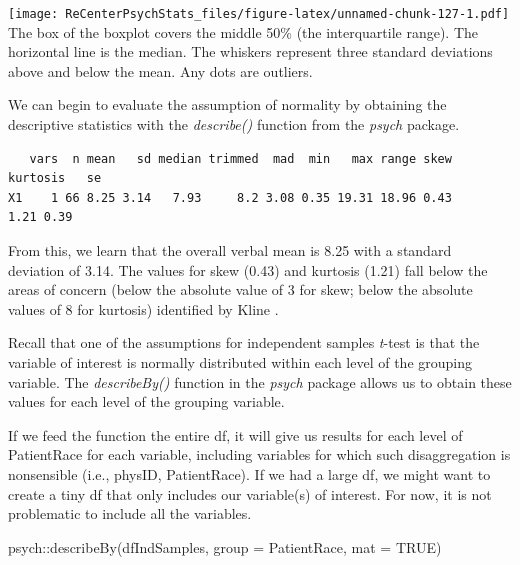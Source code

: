 \documentclass[
  11pt,
]{book}
\newenvironment{Shaded}{\begin{snugshade}}{\end{snugshade}}
\newcommand{\AttributeTok}[1]{\textcolor[rgb]{0.77,0.63,0.00}{#1}}
\newcommand{\ConstantTok}[1]{\textcolor[rgb]{0.00,0.00,0.00}{#1}}
\newcommand{\FunctionTok}[1]{\textcolor[rgb]{0.00,0.00,0.00}{#1}}
\newcommand{\NormalTok}[1]{#1}
\newcommand{\SpecialCharTok}[1]{\textcolor[rgb]{0.00,0.00,0.00}{#1}}
\begin{document}
\texttt{[image: ReCenterPsychStats\_files/figure-latex/unnamed-chunk-127-1.pdf]}
The box of the boxplot covers the middle 50\% (the interquartile range). The horizontal line is the median. The whiskers represent three standard deviations above and below the mean. Any dots are outliers.

We can begin to evaluate the assumption of normality by obtaining the descriptive statistics with the \emph{describe()} function from the \emph{psych} package.

\begin{Shaded}
\end{Shaded}

\begin{verbatim}
   vars  n mean   sd median trimmed  mad  min   max range skew kurtosis   se
X1    1 66 8.25 3.14   7.93     8.2 3.08 0.35 19.31 18.96 0.43     1.21 0.39
\end{verbatim}

From this, we learn that the overall verbal mean is 8.25 with a standard deviation of 3.14. The values for skew (0.43) and kurtosis (1.21) fall below the areas of concern (below the absolute value of 3 for skew; below the absolute values of 8 for kurtosis) identified by Kline \citeyearpar{kline_principles_2016}.

Recall that one of the assumptions for independent samples \emph{t}-test is that the variable of interest is normally distributed within each level of the grouping variable. The \emph{describeBy()} function in the \emph{psych} package allows us to obtain these values for each level of the grouping variable.

If we feed the function the entire df, it will give us results for each level of PatientRace for each variable, including variables for which such disaggregation is nonsensible (i.e., physID, PatientRace). If we had a large df, we might want to create a tiny df that only includes our variable(s) of interest. For now, it is not problematic to include all the variables.

\begin{Shaded}
\begin{Highlighting}[]
\NormalTok{psych}\SpecialCharTok{::}\FunctionTok{describeBy}\NormalTok{(dfIndSamples, }\AttributeTok{group =}\NormalTok{ PatientRace, }\AttributeTok{mat =} \ConstantTok{TRUE}\NormalTok{)}
\end{Highlighting}
\end{Shaded}
\end{document}
